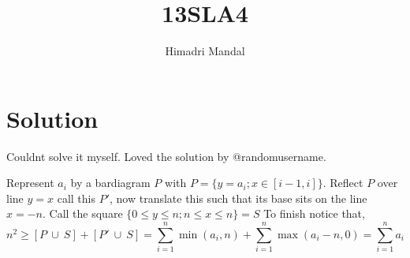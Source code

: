 \documentclass[11pt]{scrartcl}
\title{13SLA4}
\author{Himadri Mandal}
\begin{document}
\maketitle

\section{Solution}
\begin{soln}
\raggedright
	Couldnt solve it myself. Loved the solution by @randomusername.

	Represent $a_i$ by a bardiagram $P$ with $P = \{y = a_i; x \in [i-1,i]\}$. Reflect $P$ over line $y = x$ call this $P'$, now translate this such that its base sits on the line $x = -n$. 
	Call the square $\{0 \leq y \leq n; n\leq x \leq n\} = S$
	To finish notice that,
	$$n^2 \geq [P \ \cup \ S] + [P' \ \cup \ S] = \sum_{i=1}^{n}\min(a_i, n) + \sum_{i=1}^{n}\max(a_i - n, 0) = \sum_{i=1}^{n}a_i$$ 
\end{soln}
\end{document}
